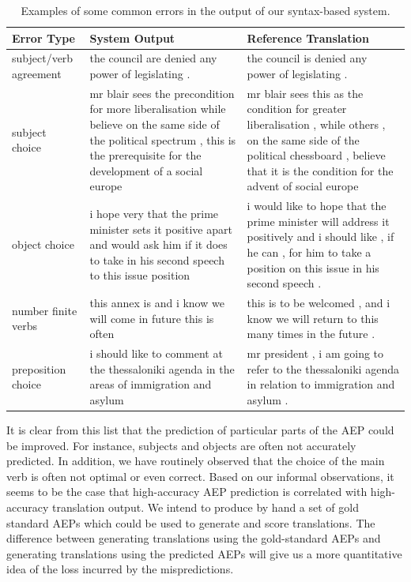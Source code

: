\documentclass[10pt]{report}
\theoremstyle{plain}
\begin{document}
{\begin{table}
\caption{Examples of some common errors in the output of our syntax-based system.}
\begin{center}
\begin{tabular}{p{.8in}|p{1.85in}p{1.85in}}
{\bf Error Type} & {\bf System Output} & {\bf Reference Translation}\\
\hline subject/verb agreement & the council are denied any power of legislating . & the council is denied any power of legislating .\\
\hline subject choice & mr blair sees the precondition for more liberalisation while believe on the same side of the political spectrum , this is the prerequisite for the development of a social europe & mr blair sees this as the condition for greater liberalisation , while others , on the same side of the political chessboard , believe that it is the condition for the advent of social europe \\
\hline object choice & i hope very that the prime minister sets it positive apart and would ask him if it does to take in his second speech to this issue position & i would like to hope that the prime minister will address it positively and i should like , if he can , for him to take a position on this issue in his second speech . \\
\hline number finite verbs & this annex is and i know we will come in future this is often & this is to be welcomed , and i know we will return to this many times in the future .\\
\hline preposition choice & i should like to comment at the thessaloniki agenda in the areas of immigration and asylum& mr president , i am going to refer to the thessaloniki agenda in relation to immigration and asylum .\\
\hline
\end{tabular}
\end{center}
\label{errors}
\end{table}

It is clear from this list that the prediction of particular parts of
the AEP could be improved. For instance, subjects and objects are
often not accurately predicted. In addition, we have routinely
observed that the choice of the main verb is often not optimal or even
correct. Based on our informal observations, it seems to be the case
that high-accuracy AEP prediction is correlated with high-accuracy
translation output. We intend to produce by hand a set of gold
standard AEPs which could be used to generate and score
translations. The difference between generating translations using the
gold-standard AEPs and generating translations using the predicted
AEPs will give us a more quantitative idea of the loss incurred by the
mispredictions.

}
\end{document}
